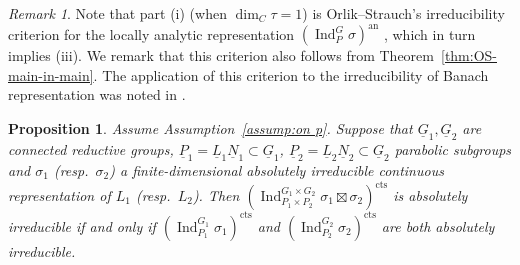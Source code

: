 \documentclass[a4paper]{amsart}
\numberwithin{equation}{section}
\newtheorem{prop}[thm]{Proposition}
\theoremstyle{remark}
\newtheorem{remark}[thm]{Remark}
\theoremstyle{definition}
\DeclareMathOperator{\Ind}{Ind}
\newcommand{\alggrp}[1]{\underline{#1}}
\newcommand{\an}{\mathrm{an}}
\newcommand{\cts}{\mathrm{cts}}
\begin{document}
\begin{remark}
  Note that part (i) (when $\dim_C \tau = 1$) is Orlik--Strauch's irreducibility criterion for the locally analytic representation $(\Ind_P^G \sigma)^\an$ \cite{OS}, which in turn implies (iii).
  We remark that this criterion also follows from Theorem~\ref{thm:OS-main-in-main}.
  The application of this criterion to the irreducibility of Banach representation was noted in \cite[Proposition 2.6(ii)]{MR2810332}.
\end{remark}

\begin{prop}\label{prop:irreducibility for product group}
Assume Assumption~\ref{assump:on p}.
Suppose that $\alggrp{G}_{1},\alggrp{G}_{2}$ are connected reductive groups, $\alggrp{P}_{1} = \alggrp{L}_{1}\alggrp{N}_{1}\subset \alggrp{G}_{1}$, $\alggrp{P}_{2} = \alggrp{L}_{2}\alggrp{N}_{2}\subset \alggrp{G}_{2}$ parabolic subgroups and $\sigma_{1}$ (resp.\ $\sigma_{2}$) a finite-dimensional absolutely irreducible continuous representation of $L_{1}$ (resp.\ $L_{2}$).
Then $(\Ind_{P_{1}\times P_{2}}^{G_{1}\times G_{2}}\sigma_{1}\boxtimes\sigma_{2})^{\cts}$ is absolutely irreducible if and only if $(\Ind_{P_{1}}^{G_{1}}\sigma_{1})^{\cts}$ and $(\Ind_{P_{2}}^{G_{2}}\sigma_{2})^{\cts}$ are both absolutely irreducible.
\end{prop}
\end{document}
